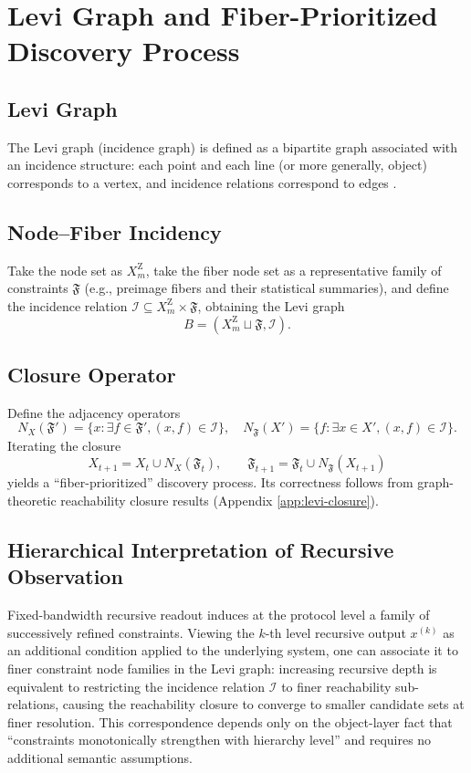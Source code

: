 \section{Levi Graph and Fiber-Prioritized Discovery Process}

\subsection{Levi Graph}

The Levi graph (incidence graph) is defined as a bipartite graph associated with an incidence structure: each point and each line (or more generally, object) corresponds to a vertex, and incidence relations correspond to edges \cite{WikipediaLeviGraph}.

\subsection{Node--Fiber Incidency}

Take the node set as $X_m^{\mathrm Z}$, take the fiber node set as a representative family of constraints $\mathfrak{F}$ (e.g., preimage fibers and their statistical summaries), and define the incidence relation $\mathcal{I}\subseteq X_m^{\mathrm Z}\times\mathfrak{F}$, obtaining the Levi graph
\[
B=(X_m^{\mathrm Z}\sqcup\mathfrak{F},\mathcal{I}).
\]

\subsection{Closure Operator}

Define the adjacency operators
\[
N_X(\mathfrak{F}')=\{x:\exists f\in\mathfrak{F}',(x,f)\in\mathcal{I}\},\quad
N_{\mathfrak{F}}(X')=\{f:\exists x\in X',(x,f)\in\mathcal{I}\}.
\]
Iterating the closure
\[
X_{t+1}=X_t\cup N_X(\mathfrak{F}_t),\qquad
\mathfrak{F}_{t+1}=\mathfrak{F}_t\cup N_{\mathfrak{F}}(X_{t+1})
\]
yields a ``fiber-prioritized'' discovery process. Its correctness follows from graph-theoretic reachability closure results (Appendix \ref{app:levi-closure}).

\subsection{Hierarchical Interpretation of Recursive Observation}
Fixed-bandwidth recursive readout induces at the protocol level a family of successively refined constraints. Viewing the $k$-th level recursive output $x^{(k)}$ as an additional condition applied to the underlying system, one can associate it to finer constraint node families in the Levi graph: increasing recursive depth is equivalent to restricting the incidence relation $\mathcal{I}$ to finer reachability sub-relations, causing the reachability closure to converge to smaller candidate sets at finer resolution. This correspondence depends only on the object-layer fact that ``constraints monotonically strengthen with hierarchy level'' and requires no additional semantic assumptions.
